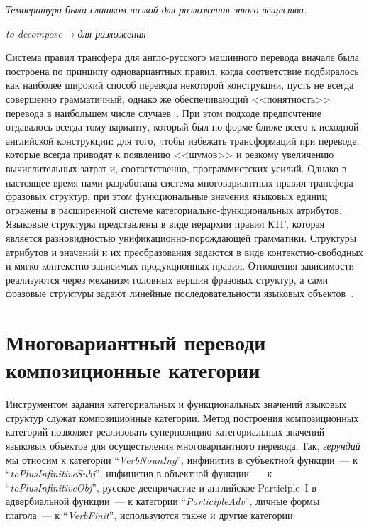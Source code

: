 \begin{multicols}{2}
\begin{enumerate}[(1)]
\textit{Температура была слишком низкой для разложения этого
вещества.}

\textit{to decompose}\;$\rightarrow$\;\textit{для разложения}
\end{enumerate}

Система правил трансфера для англо-русского машинного перевода вначале была 
построена по принципу одновариантных правил, когда соответствие подбиралось как 
наиболее широкий способ перевода некоторой конструкции, пусть не всегда 
совершенно грамматичный, однако же обеспе\-чи\-ва\-ющий <<понятность>> перевода 
в наибольшем числе случаев~\cite{10koz}. При этом подходе предпочтение 
отдавалось всегда тому вари\-ан\-ту, который был по форме ближе всего к 
исходной анг\-лий\-ской конструкции: для того, чтобы избежать трансформаций при 
пе\-ре\-во\-де, которые всегда приводят к появлению <<шумов>> и резкому 
увеличению вычислительных затрат и, соот\-вет\-ст\-вен\-но, программистских 
усилий. Одна\-ко в насто\-ящее время нами разработана систе\-ма многовариантных 
правил трансфера фра\-зовых структур, при этом функциональные значения языковых 
единиц отражены в расширенной сис\-те\-ме  
ка\-те\-го\-ри\-аль\-но-функ\-цио\-наль\-ных атрибутов. Языко\-вые 
струк\-ту\-ры представлены в виде иерар\-хии правил КТГ, которая является 
раз\-но\-вид\-ностью уни\-фи\-ка\-ци\-он\-но-по\-рож\-да\-ющей 
грам\-ма\-ти\-ки. Структуры атрибутов и значений и их преобра\-зо\-ва\-ния 
задаются в виде кон\-тек\-с\-т\-но-сво\-бод\-ных и мягко 
кон\-тек\-с\-т\-но-за\-ви\-си\-мых продукционных правил. Отношения зависимости 
реализуют\-ся через механизм головных вершин фразовых структур, а сами фразовые 
структуры задают линейные последовательности языковых 
объ\-ек\-тов~\cite{28koz}. {

}

\section{Многовариантный перевод\newline и композиционные
категории}

Инструментом задания категориальных и функциональных значений
языковых структур служат композиционные категории. Метод построения
композиционных категорий позволяет реализовать суперпозицию
категориальных значений языковых объектов для осуществления
многовариантного перевода. Так, \textit{герундий} мы относим к категории
``\textit{VerbNounIng}'', инфинитив в субъектной функции~--- к
``\textit{toPlusInfinitiveSubj}'', инфинитив в объектной функции~--- к
``\textit{toPlusInfinitiveObj}'', русское деепричастие и английское Participle~I
в адвербиальной функции~--- к категории ``\textit{ParticipleAdv}'', личные
формы глагола~--- к ``\textit{VerbFinit}'', используются также и другие
категории:


\end{multicols}
